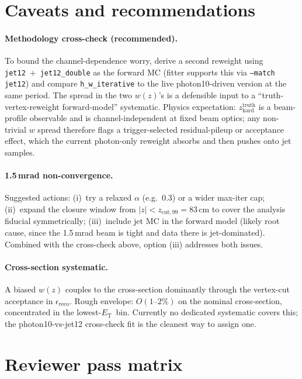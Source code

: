 \documentclass[11pt,a4paper]{article}
\newcommand{\ET}{\ensuremath{E_{\mathrm{T}}}\xspace}
\begin{document}
\section{Caveats and recommendations}

\paragraph{Methodology cross-check (recommended).}
To bound the channel-dependence worry, derive a second reweight using \texttt{jet12}~+~\texttt{jet12\_double} as the forward MC (fitter supports this via \texttt{--match jet12}) and compare \texttt{h\_w\_iterative} to the live photon10-driven version at the same period. The spread in the two $w(z)$'s is a defensible input to a ``truth-vertex-reweight forward-model'' systematic. Physics expectation: $z_{\mathrm{hard}}^{\mathrm{truth}}$ is a beam-profile observable and is channel-independent at fixed beam optics; any non-trivial $w$ spread therefore flags a trigger-selected residual-pileup or acceptance effect, which the current photon-only reweight absorbs and then pushes onto jet samples.

\paragraph{1.5\,mrad non-convergence.} Suggested actions: (i)~try a relaxed $\alpha$ (e.g.\ 0.3) or a wider max-iter cap; (ii)~expand the closure window from $|z|<z_{\mathrm{cut,99}}=83$\,cm to cover the analysis fiducial symmetrically; (iii)~include jet MC in the forward model (likely root cause, since the 1.5\,mrad beam is tight and data there is jet-dominated). Combined with the cross-check above, option (iii) addresses both issues.

\paragraph{Cross-section systematic.}
A biased $w(z)$ couples to the cross-section dominantly through the vertex-cut acceptance in $\epsilon_{\mathrm{reco}}$. Rough envelope: $O(1\text{--}2\%)$ on the nominal cross-section, concentrated in the lowest-\ET\ bin. Currently no dedicated systematic covers this; the photon10-vs-jet12 cross-check fit is the cleanest way to assign one.

\section*{Reviewer pass matrix}
\end{document}
